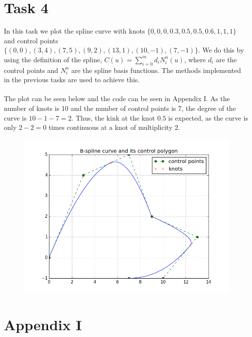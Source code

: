 \documentclass[]{article}
\begin{document}
\section*{Task 4}
In this task we plot the spline curve with knots $\{0, 0, 0, 0.3, 0.5, 0.5, 0.6, 1, 1, 1\}$ and control points 
$\{(0, 0), (3, 4), (7, 5), (9, 2), (13, 1), (10, -1), (7, -1)\}$. We do this by using the definition of the spline, $C(u)=\sum_{i=0}^{m}d_iN_i^n(u)$, where $d_i$ are the control points and $N_i^n$ are the spline basis functions. The methods implemented in the previous tasks are used to achieve this. \\
\\
The plot can be seen below and the code can be seen in Appendix I. As the number of knots is 10 and the number of control points is 7, the degree of the curve is $10 - 1 - 7 = 2$. Thus, the kink at the knot $0.5$ is expected, as the curve is only $2-2=0$ times continuous at a knot of multiplicity $2$.
\begin{figure}[h!]
	\includegraphics[scale=0.6]{bspline}
\end{figure}


\newpage
\section*{Appendix I}

\end{document}
